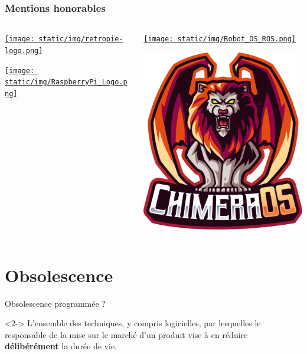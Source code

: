 \documentclass{beamer}
\begin{document}
\begin{frame}
	\frametitle{Mentions honorables}
	
		\begin{columns}
		\begin{column}{.5\linewidth}
			\centering
			\href{https://retropie.org.uk/}{\texttt{[image: static/img/retropie-logo.png]}}
			
			\href{https://www.raspberrypi.com/software/}{\texttt{[image: static/img/RaspberryPi\_Logo.png]}}
		\end{column}
		
		\begin{column}{.5\linewidth}
			\centering
			\href{https://www.ros.org/}{\texttt{[image: static/img/Robot\_OS\_ROS.png]}}
			
			\href{https://chimeraos.org/}{\includegraphics[width=.5\linewidth]{static/img/chimeraos.png}}
		\end{column}
	\end{columns}
\end{frame}

\section{Obsolescence}

\begin{frame}{Obsolescence programmée ?}
	\begin{definition}<2->
		L'ensemble des techniques, y compris logicielles, par lesquelles le responsable de la mise sur le marché d'un produit vise à en réduire \textbf{délibérément} la durée de vie.
	\end{definition}
	
\end{frame}
\end{document}
